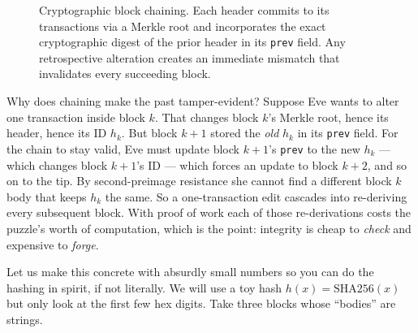 \begin{figure}[H]
\caption{Cryptographic block chaining. Each header commits to its transactions via a Merkle root and incorporates the exact cryptographic digest of the prior header in its \texttt{prev} field. Any retrospective alteration creates an immediate mismatch that invalidates every succeeding block.}
\label{ch36:fig-chain}
\end{figure}

\begin{whybox}
Why does chaining make the past tamper-evident? Suppose Eve wants to alter one transaction inside block $k$. That changes block $k$'s Merkle root, hence its header, hence its ID $h_k$. But block $k{+}1$ stored the \emph{old} $h_k$ in its \texttt{prev} field. For the chain to stay valid, Eve must update block $k{+}1$'s \texttt{prev} to the new $h_k$ --- which changes block $k{+}1$'s ID --- which forces an update to block $k{+}2$, and so on to the tip. By second-preimage resistance she cannot find a different block $k$ body that keeps $h_k$ the same. So a one-transaction edit cascades into re-deriving every subsequent block. With proof of work each of those re-derivations costs the puzzle's worth of computation, which is the point: integrity is cheap to \emph{check} and expensive to \emph{forge}.
\end{whybox}

Let us make this concrete with absurdly small numbers so you can do the hashing in spirit, if not literally. We will use a toy hash $h(x) = \mathrm{SHA256}(x)$ but only look at the first few hex digits. Take three blocks whose ``bodies'' are strings.

